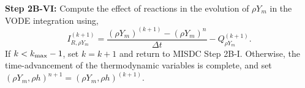 {\bf Step 2B-VI:} Compute the effect of reactions in the evolution of $\rho Y_m$ in the VODE integration using,
\begin{equation}
I_{R,\rho Y_m}^{(k+1)} = \frac{(\rho Y_m)^{(k+1)} - (\rho Y_m)^n}{\Delta t} - Q_{\rho Y_m}^{(k+1)}.
\end{equation}
If $k<k_{\rm max}-1$, set $k=k+1$ and return to MISDC Step 2B-I.  Otherwise, the 
time-advancement of the thermodynamic variables is complete, and set 
$(\rho Y_m,\rho h)^{n+1} = (\rho Y_m,\rho h)^{(k+1)}$.
